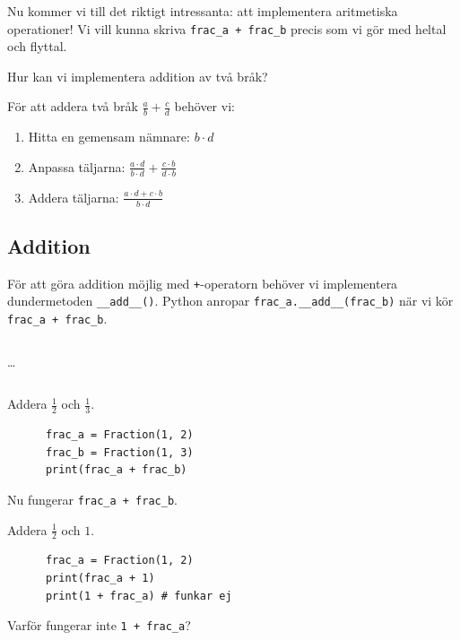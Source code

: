 Nu kommer vi till det riktigt intressanta: att implementera aritmetiska 
operationer! Vi vill kunna skriva \texttt{frac_a + frac_b} precis 
som vi gör med heltal och flyttal.

\begin{exercise}
  Hur kan vi implementera addition av två bråk?
\end{exercise}

För att addera två bråk \(\frac{a}{b} + \frac{c}{d}\) behöver vi:
\begin{enumerate}
  \item Hitta en gemensam nämnare: \(b \cdot d\)
  \item Anpassa täljarna: \(\frac{a \cdot d}{b \cdot d} + \frac{c \cdot b}{d \cdot b}\)
  \item Addera täljarna: \(\frac{a \cdot d + c \cdot b}{b \cdot d}\)
\end{enumerate}

\subsection{Addition}

För att göra addition möjlig med \texttt{+}-operatorn behöver vi 
implementera dundermetoden \texttt{__add__()}.
Python anropar \texttt{frac_a.__add__(frac_b)} när vi kör
\texttt{frac_a + frac_b}.

\begin{frame}[fragile]
  \inputminted[linenos,firstline=3,lastline=3]{python}{examples/myfrac_add.py}
  \dots
  \inputminted[autogobble=false,linenos,firstline=31,lastline=40]{python}{examples/myfrac_add.py}

  \begin{example}
    Addera \(\frac{1}{2}\) och \(\frac{1}{3}\).
    \begin{verbatim}
      frac_a = Fraction(1, 2)
      frac_b = Fraction(1, 3)
      print(frac_a + frac_b)
    \end{verbatim}
  \end{example}
\end{frame}

Nu fungerar \texttt{frac_a + frac_b}.

\begin{frame}[fragile]
  \begin{example}
    Addera \(\frac{1}{2}\) och \(1\).
    \begin{verbatim}
      frac_a = Fraction(1, 2)
      print(frac_a + 1)
      print(1 + frac_a) # funkar ej
    \end{verbatim}
  \end{example}
  \begin{exercise}
    Varför fungerar inte \texttt{1 + frac_a}?
  \end{exercise}
\end{frame}

